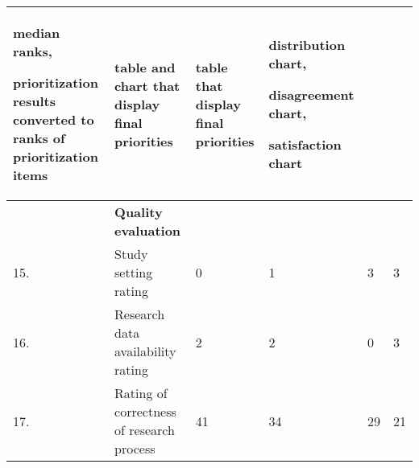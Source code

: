 \begin{table}
{\begin{tabular}{|>{\raggedright}p{}|>{\raggedright}p{}|>{\raggedright}p{}|>{\raggedright}p{}|>{\raggedright}p{}|>{\raggedright}p{}|}
median ranks,

prioritization results converted to ranks of prioritization items &
table and chart that display final priorities
&
table that display final priorities
&
distribution chart,

disagreement chart,

satisfaction chart\tabularnewline
\hline 
 & \textbf{Quality evaluation} &  &  &  & \tabularnewline
\hline 
15. & Study setting rating & 0 & 1 & 3 & 3\tabularnewline
\hline 
16. & Research data availability rating & 2 & 2 & 0 & 3\tabularnewline
\hline 
17. & Rating of correctness of research process & 41 & 34 & 29 & 21\tabularnewline
\hline
\end{tabular}%
}
\end{table}

